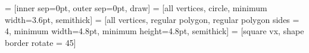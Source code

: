 \newcommand\p{p}\newcommand\pp{\dual p}\newcommand\ppp{\dual\pp}
\newcommand\q{q}\newcommand\qq{\dual q}
\newcommand\px{\p x}
\newcommand\py{\p y}
\newcommand\pxy{\p x y}
\newcommand\ppx{\pp x}
\newcommand\ppy{\pp y}
\newcommand\pa{\p a}
\newcommand\pb{\p b}
\newcommand\ppa{\pp a}
\newcommand\ppb{\pp b}
\newcommand\pz{\p z}
\newcommand\ppz{\pp z}
\newcommand\axpx{\forall x\mkern2.2mu\px}
\newcommand\aypy{\forall y \mkern3mu \py}
\newcommand\qab{\q a b}
\newcommand\qba{\q b a}
\newcommand\qqab{\qq a b}
\newcommand\qqba{\qq b a}
\newcommand\qx{\q x}
\newcommand\qy{\q y}
\newcommand\qqx{\qq x}
\newcommand\qqy{\qq y}
\newcommand\qxy{\q x y}
\newcommand\fx{f\mkern-1.5mu x}
\newcommand\fy{f\mkern-1.5mu y}
\newcommand\fz{f\mkern-1.5mu z}
\newcommand\pfx{\p\mkern-1mu \fx}
\newcommand\qfz{\q \fz}
\newcommand\qqfz{\qq \fz}
\newcommand\pfy{\p\mkern-2mu \fy}
\newcommand\ffy{f\mkern-4mu \fy}
\newcommand\pffy{\p\mkern-2mu \ffy}
\newcommand\ppffy{\pp\mkern-2mu \ffy}
\newcommand\allx{\forall x}
\newcommand\ally{\forall y}
\newcommand\existsx{\exists x}
\newcommand\existsy{\exists y}
\newcommand\rx{rx}
\newcommand\rz{rz}





\newcommand{\nohang}[1]{\raisebox{0ex}[\height][0ex]{$#1$}}
\newcommand\likex[1]{\raisebox{0ex}[1ex][0ex]{$#1$}}
\newlength\fheight\settoheight{}
\newlength\pbarheight\settoheight\pbarheight{$\pp$}
\newcommand\likef[1]{\raisebox{0ex}[\the\fheight][0ex]{$#1$}}
\newcommand\likepbar[1]{\raisebox{0ex}[\the\pbarheight][0ex]{$#1$}}








\newcommand\roundvxwidth{3.6pt}

 = [inner sep=0pt, outer sep=0pt, draw]
     = [all vertices, circle, minimum width=\roundvxwidth, semithick]
\newcommand\squarewidth{4.8pt}
    = [all vertices, regular polygon, regular polygon sides = 4, minimum width=\squarewidth, minimum height=\squarewidth, semithick]
   = [square vx, shape border rotate = 45]

